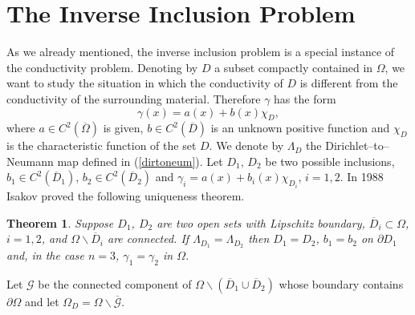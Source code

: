 \documentclass[10pt, a4paper, twoside, openright]{book}
\theoremstyle{definition}
\theoremstyle{plain}
\newtheorem{theorem}[subsection]{Theorem}
\theoremstyle{plain}
\theoremstyle{plain}
\theoremstyle{plain}
\theoremstyle{plain}
\theoremstyle{plain}
\theoremstyle{plain}
\theoremstyle{plain}
\begin{document}
\section{The Inverse Inclusion Problem}
\label{incluniq}
As we already mentioned, the inverse inclusion problem is a special instance of the conductivity problem.
Denoting by $D$ a subset compactly contained in $\Omega$, we want to study the situation in which the
conductivity of $D$ is different from the conductivity of the surrounding material. Therefore $\gamma$ has the form
$$\gamma(x)=a(x)+b(x)\chi_D,$$
where $a\in C^2(\overline{\Omega})$ is given, $b\in C^2(\overline{D})$
is an unknown positive function
and $\chi_D$ is the characteristic function of the set $D$.
We denote by $\Lambda_D$ the Dirichlet--to--Neumann map
defined in (\ref{dirtoneum}).
Let $D_1$, $D_2$ be two possible inclusions,
$b_1\in C^2(\overline{D}_1)$, $b_2\in C^2(\overline{D}_2)$
and $\gamma_i=a(x)+b_i(x)\chi_{D_i}$, $i=1,2$.
In 1988 Isakov \cite{Is88} proved the following uniqueness theorem.
\begin{theorem}
\label{isuniq}
Suppose $D_1$, $D_2$ are two open sets with Lipschitz boundary,
$\overline{D}_i\subset\Omega$, $i=1,2$,
 and $\Omega\backslash\overline{D}_i$ are connected.
If $\Lambda_{D_1}=\Lambda_{D_2}$ then
$D_1=D_2$,
$b_1=b_2$ on $\partial D_1$ and, in the case $n=3$,
$\gamma_1=\gamma_2$ in $\Omega$.
\end{theorem}

Let $\mathcal{G}$ be the connected component of
$\Omega\backslash(\overline{D}_1\cup\overline{D}_2)$ whose boundary
contains
$\partial\Omega$ and let $\Omega_D=\Omega\backslash\overline{\mathcal{G}}$.
\end{document}
